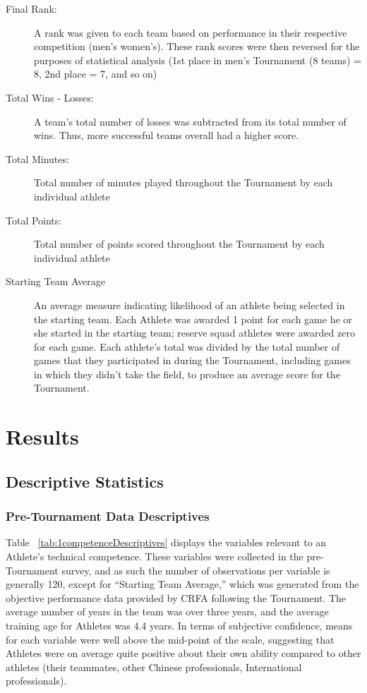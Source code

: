 \begin{description}
\item [Final Rank:] A rank was given to each team based on performance in their respective competition (men's   women's). These rank scores were then reversed for the purposes of statistical analysis (1st place in men's Tournament (8 teams) = 8, 2nd place = 7, and so on)
\item [Total Wins - Losses:] A team's total number of losses was subtracted from its total number of wins.  Thus, more successful teams overall had a higher score.
\item [Total Minutes:] Total number of minutes played throughout the Tournament by each individual athlete
\item [Total Points:] Total number of points scored throughout the Tournament by each individual athlete
\item [Starting Team Average] An average measure indicating likelihood of an athlete being selected in the starting team. Each Athlete was awarded 1 point for each game he or she started in the starting team; reserve squad athletes were awarded zero for each game. Each athlete's total was divided by the total number of games that they participated in during the Tournament, including games in which they didn't take the field, to produce an average score for the Tournament.
\end{description}





\section{Results}


\subsection{Descriptive Statistics}


\subsubsection{\label{app5:descriptivesPre}Pre-Tournament Data Descriptives}


Table ~\ref{tab:1competenceDescriptives} displays the variables relevant to an Athlete's technical competence.  These variables were collected in the pre-Tournament survey, and as such the number of observations per variable is generally 120, except for ``Starting Team Average,'' which was generated from the objective performance data provided by CRFA following the Tournament.  The average number of years in the team was over three years, and the average training age for Athletes was 4.4 years.  In terms of subjective confidence, means for each variable were well above the mid-point of the scale, suggesting that Athletes were on average quite positive about their own ability compared to other athletes (their teammates, other Chinese professionals, International professionals).


